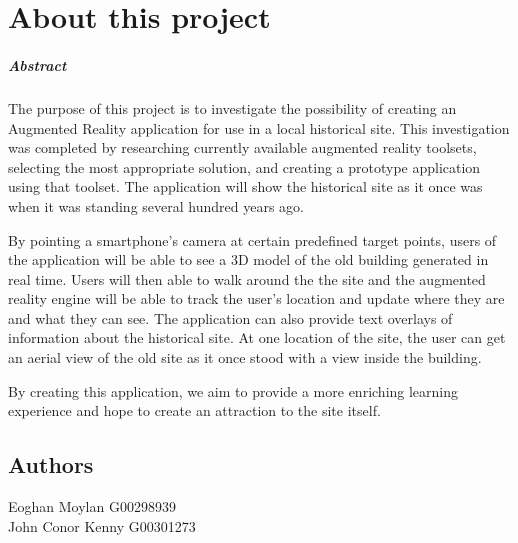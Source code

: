 
\graphicspath{ {/Home/Users/TheShockMaster/Desktop} }

\chapter*{About this project}

\paragraph{Abstract}
The purpose of this project is to investigate the possibility of creating an Augmented Reality application for use in a local historical site. This investigation was completed by researching currently available augmented reality toolsets, selecting the most appropriate solution, and creating a prototype application using that toolset. The application will show the historical site as it once was when it was standing several hundred years ago.

By pointing a smartphone’s camera at certain predefined target points, users of the application will be able to see a 3D model of the old building generated in real time. Users will then able to walk around the the site and the augmented reality engine will be able to track the user’s location and update where they are and what they can see. The application can also provide text overlays of information about the historical site. At one location of the site, the user can get an aerial view of the old site as it once stood with a view inside the building.

By creating this application, we aim to provide a more enriching learning experience and hope to create an attraction to the site itself.
\section{Authors}
Eoghan Moylan G00298939 \\
John Conor Kenny G00301273
